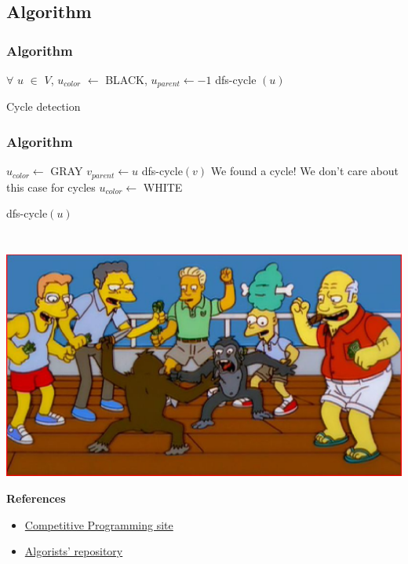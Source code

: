 \documentclass[article]{beamer}
\begin{document}

\subsection{Algorithm}
\begin{frame}
	\frametitle{Algorithm}
	\begin{algorithm}[H]
		\begin{algorithmic}[1]
		\STATE $\forall$ $u$ $\in$ $V$, $u_{color}$ $\gets$ BLACK, $u_{parent} \gets -1$				
		\STATE dfs-cycle $(u)$
		\ENDIF
		\ENDFOR		
		
		\end{algorithmic}
		\caption{Cycle detection}
		\label{alg:seq}
		\end{algorithm}
\end{frame}

\begin{frame}
	\frametitle{Algorithm}
	\begin{algorithm}[H]
		\begin{algorithmic}[1]
		\STATE $u_{color} \gets$ GRAY
		\STATE $v_{parent} \gets u$
		\STATE dfs-cycle$(v)$
		\STATE We found a cycle!
		\STATE We don't care about this case for cycles
		\ENDIF
		\ENDFOR
		\STATE $u_{color} \gets$ WHITE
		\end{algorithmic}
		\caption{dfs-cycle$(u)$}
		\label{alg:seq}
		\end{algorithm}
\end{frame}

\begin{frame}[plain]
\frametitle{}
\begin{center}
\Huge{\color{blue}{Q \& A}} \\
\vspace{5mm}
\includegraphics[scale=0.4]{./figures/monkey_fight.eps}
\end{center}
\end{frame}

\begin{frame}[plain]
	\textbf{References}
	\begin{itemize}
		\item \href{https://sites.google.com/site/stevenhalim/}{Competitive Programming site}
		\item \href{https://github.com/davidjacobo/algorists/}{Algorists' repository}
	\end{itemize}
\end{frame}
\end{document}
